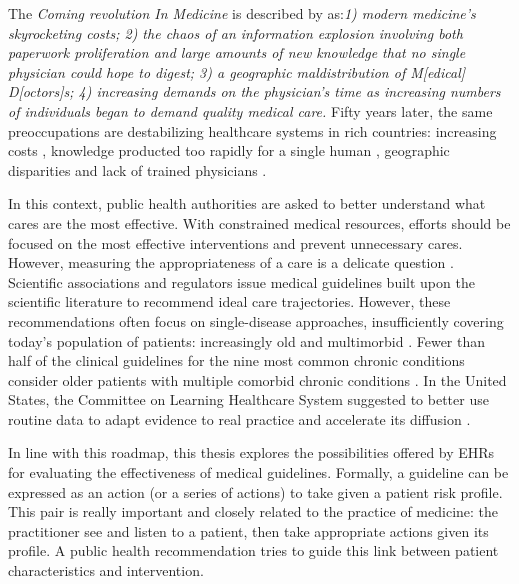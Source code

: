 \documentclass[french,12pt,twoside,a4paper]{book}
\begin{document}
The \emph{Coming revolution In Medicine} is described by
\cite{rutstein1967coming} as:\textit{1) modern medicine's skyrocketing costs; 2)
  the chaos of an information explosion involving both paperwork proliferation and
  large amounts of new knowledge that no single physician could hope to digest; 3)
  a geographic maldistribution of M[edical] D[octors]s; 4) increasing demands on
  the physician's time as increasing numbers of individuals began to demand
  quality medical care.} Fifty years later, the same preoccupations are
destabilizing healthcare systems in rich countries: increasing costs
\citep{data_oecd_health_spending}, knowledge producted too rapidly for a single
human \citep{mcginnis2013best}, geographic disparities and lack of trained
physicians \citep{anguis2021quelle,aamc2021}.

In this context, public health authorities are asked to better understand what
cares are the most effective. With constrained medical resources, efforts should
be focused on the most effective interventions and prevent unnecessary cares.
However, measuring the appropriateness of a care is a delicate question
\citep{cma_policy_appropriateness_2015}. Scientific associations and regulators
issue medical guidelines built upon the scientific literature to recommend ideal
care trajectories. However, these recommendations often focus on single-disease
approaches, insufficiently covering today's population of patients: increasingly
old and multimorbid \citep{skou2022multimorbidity}. Fewer than half of the
clinical guidelines for the nine most common chronic conditions consider older
patients with multiple comorbid chronic conditions
\citep{boyd2005clinical,parekh2010challenge}. In the United States, the
Committee on Learning Healthcare System suggested to better use routine data to
adapt evidence to real practice and accelerate its diffusion
\citep{mcginnis2013best}.

In line with this roadmap, this thesis explores the possibilities offered by
EHRs for evaluating the effectiveness of medical guidelines. Formally, a
guideline can be expressed as an action (or a series of actions) to take given a
patient risk profile. This pair is really important and closely related to the
practice of medicine: the practitioner see and listen to a patient, then take
appropriate actions given its profile. A public health recommendation tries to
guide this link between patient characteristics and intervention.
\end{document}

